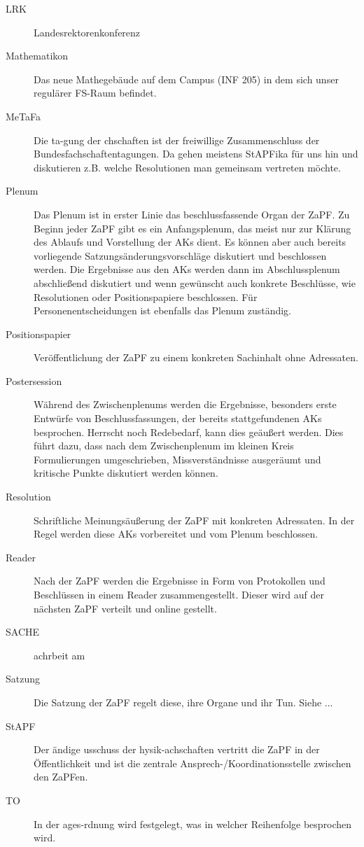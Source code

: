 \begin{description}
	\item[LRK] Landesrektorenkonferenz
	\item[Mathematikon] Das neue Mathegebäude auf dem Campus (INF 205) in dem sich unser regulärer FS-Raum befindet.
	\item[MeTaFa] Die ta-gung der chschaften ist der freiwillige Zusammenschluss der Bundesfachschaftentagungen. Da gehen meistens StAPFika für uns hin und diskutieren z.B. welche Resolutionen man gemeinsam vertreten möchte.
	\item[Plenum] Das Plenum ist in erster Linie das beschlussfassende Organ der ZaPF. Zu Beginn jeder ZaPF gibt es ein Anfangsplenum, das meist nur zur Klärung des Ablaufs und Vorstellung der AKs dient. Es können aber auch bereits vorliegende Satzungsänderungsvorschläge diskutiert und beschlossen werden. Die Ergebnisse aus den AKs werden dann im Abschlussplenum abschließend diskutiert und wenn gewünscht auch konkrete Beschlüsse, wie Resolutionen oder Positionspapiere beschlossen. Für Personenentscheidungen ist ebenfalls das Plenum zuständig.
	\item[Positionspapier] Veröffentlichung der ZaPF zu einem konkreten Sachinhalt ohne Adressaten.  
	\item[Postersession] Während des Zwischenplenums werden die Ergebnisse, besonders erste Entwürfe von Beschlussfassungen, der bereits stattgefundenen AKs besprochen. Herrscht noch Redebedarf, kann dies geäußert werden. Dies führt dazu, dass nach dem Zwischenplenum im kleinen Kreis Formulierungen umgeschrieben, Missverständnisse ausgeräumt und kritische Punkte diskutiert werden können. 
	\item[Resolution] Schriftliche Meinungsäußerung der ZaPF mit konkreten Adressaten. In der Regel werden diese AKs vorbereitet und vom Plenum beschlossen.
	\item[Reader] Nach der ZaPF werden die Ergebnisse in Form von Protokollen und Beschlüssen in einem Reader zusammengestellt. Dieser wird auf der nächsten ZaPF verteilt und online gestellt. 
	\item[SACHE] achrbeit am 
	\item[Satzung] Die Satzung der ZaPF regelt diese, ihre Organe und ihr Tun. Siehe ...
	\item[StAPF] Der ändige usschuss der hysik-achschaften vertritt die ZaPF in der Öffentlichkeit und ist die zentrale Ansprech-/Koordinationsstelle zwischen den ZaPFen.
	\item[TO] In der ages-rdnung wird festgelegt, was in welcher Reihenfolge besprochen wird.

\end{description}
